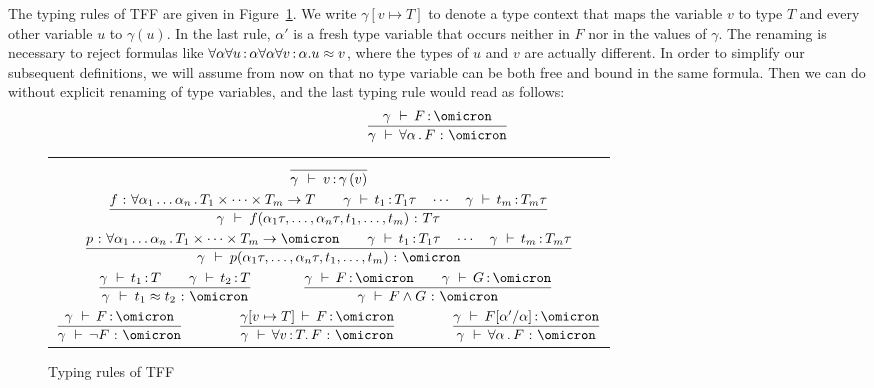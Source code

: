 The typing rules of TFF are given in Figure~\ref{fig:typing}.
We write $\gamma[v \mapsto T]$ to denote a type context that maps the
variable $v$ to type $T$ and every other variable $u$ to $\gamma(u)$.
In the last rule, $\alpha'$ is a fresh type variable that
occurs neither in $F$ nor in the values of $\gamma$.
The renaming is necessary to reject formulas like
$\forall\alpha\forall u\operatorname{:}\alpha\forall\alpha\forall v\operatorname{:}\alpha.
u \approx v$, where the types of $u$ and $v$ are actually different.
In order to simplify our subsequent definitions, we will assume from now
on that no type variable can be both free and bound in the same formula.
Then we can do without explicit renaming of type variables,
and the last typing rule would read as follows:
$$\frac{\gamma\, \,\vdash\, F \ty \omicron}{
\gamma\, \,\vdash\, \forall \alpha \,.\, F \,\ty\, \omicron}$$

\begin{figure}
\begin{center}
\begin{tabular}{c@{\qquad\qquad}c}
\multicolumn{2}{c}{$\displaystyle
\frac{}{\gamma\, \:\vdash\: v \operatorname{:} \gamma\,(v)}$} \\[4ex]
\multicolumn{2}{c}{$\displaystyle
\frac{f \,\operatorname{:}\, \forall \alpha_1\dots\alpha_n \,.\,
    T_1 \times \dots \times T_m \to T
\qquad
\gamma\, \,\vdash\, t_1 \operatorname{:} T_1\tau
\quad\cdots\quad
\gamma\, \,\vdash\, t_m \operatorname{:} T_m\tau
}{\gamma\, \:\vdash\:
f(\alpha_1\tau,\dots,\alpha_n\tau,t_1,\dots,t_m) \,\operatorname{:}\, T\tau}
$} \\[4ex]
\multicolumn{2}{c}{$\displaystyle
\frac{p \,\ty\, \forall \alpha_1\dots\alpha_n \,.\,
    T_1 \times \dots \times T_m \to \omicron
\qquad
\gamma\, \,\vdash\, t_1 \ty T_1\tau
\quad\cdots\quad
\gamma\, \,\vdash\, t_m \ty T_m\tau
}{\gamma\, \:\vdash\:
p(\alpha_1\tau,\dots,\alpha_n\tau,t_1,\dots,t_m) \,\ty\, \omicron}
$} \\[4ex]
$\qquad\displaystyle
\frac{\gamma\, \,\vdash\, t_1 \ty T \qquad \gamma\, \,\vdash\, t_2 \ty T}{
\gamma\, \:\vdash\: t_1 \approx t_2 \,\ty\, \omicron}$ &
$\displaystyle
\frac{\gamma\, \,\vdash\, F \ty \omicron \qquad
\gamma\, \,\vdash\, G \ty \omicron}{
\gamma\, \,\vdash\, F \land G \,\ty\, \omicron}\qquad$ \\[4ex]
\multicolumn{2}{c}{
$\displaystyle
\frac{\gamma\, \,\vdash\, F \ty \omicron}{
\gamma\, \,\vdash\, \lnot F \,\ty\, \omicron}\qquad\qquad
\frac{\gamma[v \mapsto T] \,\vdash\, F \ty \omicron}{
\gamma\, \,\vdash\, \forall v \ty T .\, F \,\ty\, \omicron}\qquad\qquad
\frac{\gamma\, \,\vdash\, F[\alpha'/\alpha] \ty \omicron}{
\gamma\, \,\vdash\, \forall \alpha \,.\, F \,\ty\, \omicron}$}
\end{tabular}
\end{center}
\caption{Typing rules of TFF}
\label{fig:typing}
\end{figure}

